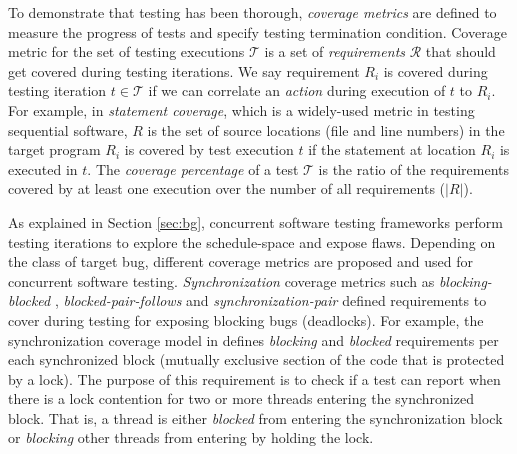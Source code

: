 
To demonstrate that testing has been thorough, \textit{coverage metrics} are defined to measure the progress of tests and specify testing termination condition.
%
Coverage metric for the set of testing executions $\mathcal{T}$ is a set of \textit{requirements} $\mathcal{R}$ that should get covered during testing iterations.
%
We say requirement $R_i$ is covered during testing iteration $t \in \mathcal{T}$ if we can correlate an \textit{action} during execution of $t$ to $R_i$.
%
For example, in \textit{statement coverage}, which is a widely-used metric in testing sequential software, $R$ is the set of source locations (file and line numbers) in the target program
%
$R_i$ is covered by test execution $t$ if the statement at location $R_i$ is executed in $t$.
%
The \textit{coverage percentage} of a test $\mathcal{T}$ is the ratio of the requirements covered by at least one execution over the number of all requirements ($|R|$).

As explained in Section \ref{sec:bg}, concurrent software testing frameworks perform testing iterations to explore the schedule-space and expose flaws.
%
Depending on the class of target bug, different coverage metrics are proposed and used for concurrent software testing.
%
\textit{Synchronization} coverage metrics such as \textit{blocking-blocked} \cite{edelstein2003contest}, \textit{blocked-pair-follows} \cite{trainin-followsCoverage-padtad09} and \textit{synchronization-pair} \cite{hong-syncTesting-issta12} defined requirements to cover during testing for exposing blocking bugs (\eg deadlocks).
%
%
For example, the synchronization coverage model in \cite{edelstein2003contest} defines \textit{blocking} and \textit{blocked} requirements per each synchronized block (\ie mutually exclusive section of the code that is protected by a lock).
%
The purpose of this requirement is to check if a test can report when there is a lock contention for two or more threads entering the synchronized block.
%
That is, a thread is either \textit{blocked} from entering the synchronization block or \textit{blocking} other threads from entering by holding the lock.
%

